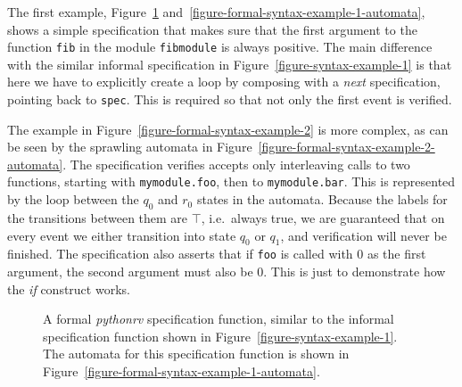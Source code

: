 The first example, Figure~\ref{figure-formal-syntax-example-1}
and~\ref{figure-formal-syntax-example-1-automata}, shows a simple specification
that makes sure that the first argument to the function \texttt{fib} in the
module \texttt{fibmodule} is always positive. The main difference with the
similar informal specification in Figure~\ref{figure-syntax-example-1} is that
here we have to explicitly create a loop by composing with a \textit{next}
specification, pointing back to \texttt{spec}. This is required so that not
only the first event is verified.

The example in Figure~\ref{figure-formal-syntax-example-2} is more complex, as
can be seen by the sprawling automata in
Figure~\ref{figure-formal-syntax-example-2-automata}. The specification
verifies accepts only interleaving calls to two functions, starting with
\texttt{mymodule.foo}, then to \texttt{mymodule.bar}. This is represented by
the loop between the $q_0$ and $r_0$ states in the automata. Because the labels
for the transitions between them are $\top$, i.e.\ always true, we are
guaranteed that on every event we either transition into state $q_0$ or $q_1$,
and verification will never be finished. The specification also asserts that if
\texttt{foo} is called with $0$ as the first argument, the second argument must
also be $0$. This is just to demonstrate how the \textit{if} construct works.


\begin{figure}[h!]
	\begin{center}
	\begin{minipage}{0.9\textwidth}
	
	\end{minipage}
	\end{center}

  \caption{A formal \textit{pythonrv} specification function, similar to the
    informal specification function shown in
    Figure~\ref{figure-syntax-example-1}. The automata for this specification
    function is shown in Figure~\ref{figure-formal-syntax-example-1-automata}.}
	\label{figure-formal-syntax-example-1}
\end{figure}

